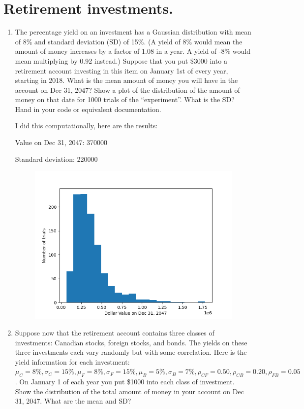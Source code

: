 \section{Retirement investments.}

\begin{enumerate}[label=\textbf{\Alph*}.]

    \item The percentage yield on an investment has a Gaussian distribution with mean of 8\% and standard deviation (SD) of 15\%. (A yield of 8\% would mean the amount of money increases by a factor of 1.08 in a year. A yield of -8\% would mean multiplying by 0.92 instead.) Suppose that you put \$3000 into a retirement account investing in this item on January 1st of every year, starting in 2018. What is the mean amount of money you will have in the account on Dec 31, 2047? Show a plot of the distribution of the amount of money on that date for 1000 trials of the ``experiment''. What is the SD? Hand in your code or equivalent documentation.

    I did this computationally, here are the results:

    Value on Dec 31, 2047: 370000

    Standard deviation: 220000

    \begin{figure}[H]
        \includegraphics[width=\textwidth]{q4_a.png}
    \end{figure}

    \item Suppose now that the retirement account contains three classes of investments: Canadian stocks, foreign stocks, and bonds. The yields on these three investments each vary randomly but with some correlation. Here is the yield information for each investment: $\mu_C = 8\%, \sigma_C = 15\%, \mu_F = 8\%, \sigma_F = 15\%, \mu_B = 5\%, \sigma_B = 7\%, \rho_{CF}=0.50, \rho_{CB}=0.20, \rho_{FB}=0.05$. On January 1 of each year you put \$1000 into each class of investment. Show the distribution of the total amount of money in your account on Dec 31, 2047. What are the mean and SD?


\end{enumerate}
